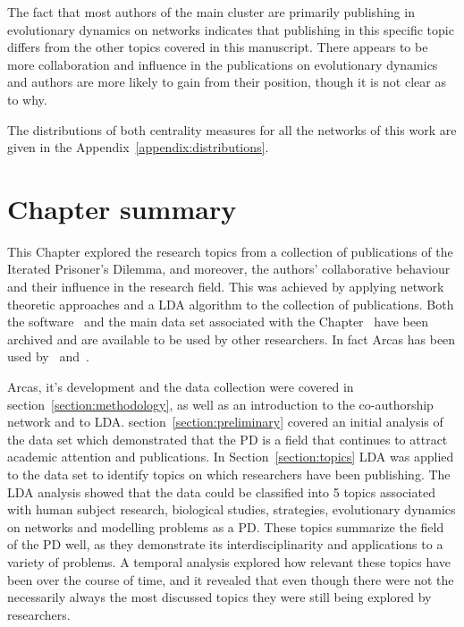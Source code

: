 The fact that most authors of the main cluster are primarily publishing in
evolutionary dynamics on networks indicates that publishing in this specific
topic differs from the other topics covered in this manuscript. There appears to
be more collaboration and influence in the publications on evolutionary
dynamics and authors are more likely to gain from their position,
though it is not clear as to why.

The distributions of both centrality measures for all the networks of this
work are given in the Appendix~\ref{appendix:distributions}.

\section{Chapter summary}\label{section:conclusion}

This Chapter explored the research topics from a collection of \totalarticles publications of the
Iterated Prisoner's Dilemma, and moreover, the authors' collaborative behaviour
and their influence in the research field. This was achieved by
applying network theoretic approaches and a LDA algorithm to the collection of publications.
Both the software~\cite{nikoleta_2017} and the main data set associated with the Chapter~\cite{nikoleta_2017}
have been archived and are available to be used by other researchers. In
fact Arcas has been used by~\cite{brane} and~\cite{arcas_blog}.

Arcas, it's development and the data collection were covered in section~\ref{section:methodology},
as well as an introduction to the co-authorship network and to LDA.
section~\ref{section:preliminary} covered an initial analysis of the data set
which demonstrated that the PD is a field that continues to attract academic
attention and publications. In Section~\ref{section:topics} LDA was
applied to the data set to identify topics on which researchers have been
publishing. The LDA analysis showed that the data could be classified into 5
topics associated with human subject research, biological studies, strategies,
evolutionary dynamics on networks and modelling
problems as a PD. These topics summarize the field of the PD well, as they
demonstrate its interdisciplinarity and applications to a variety of problems. A
temporal analysis explored how relevant these topics have been over the course
of time, and it revealed that even though there were not the necessarily always
the most discussed topics they were still being explored by researchers.

